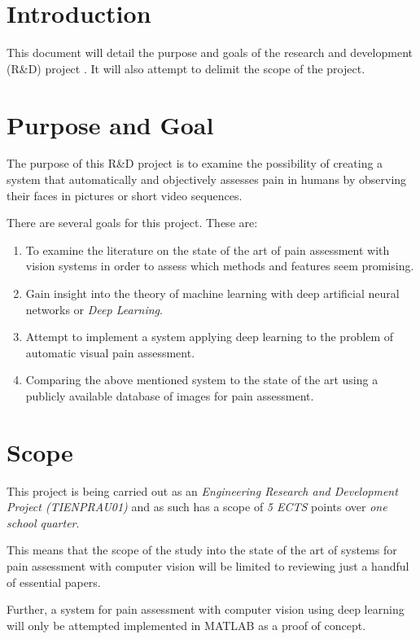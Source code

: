 \documentclass[Main]{subfiles}
\begin{document}
\section{Introduction} %
	\label{sec:introduction}
	This document will detail the purpose and goals of the research and development (R\&D) project \emph{\projectTitle}.
	It will also attempt to delimit the scope of the project.


\section{Purpose and Goal} %
	\label{sec:purpose_and_goal}
	The purpose of this R\&D project is to examine the possibility of creating a system that automatically and objectively  assesses pain in humans by observing their faces in pictures or short video sequences.

	There are several goals for this project.
	These are:
	\begin{enumerate}
		\item 
			To examine the literature on the state of the art of pain assessment with vision systems in order to assess which methods and features seem promising.
		\item
			Gain insight into the theory of machine learning with deep artificial neural networks or \emph{Deep Learning}.
		\item
			Attempt to implement a system applying deep learning to the problem of automatic visual pain assessment.
		\item 
			Comparing the above mentioned system to the state of the art using a publicly available database of images for pain assessment.
	\end{enumerate}


\section{Scope} %
	\label{sec:scope}
	This project is being carried out as an \emph{Engineering Research and Development Project (TIENPRAU01)} and as such has a scope of \emph{5 ECTS} points over \emph{one school quarter}.

	This means that the scope of the study into the state of the art of systems for pain assessment with computer vision will be limited to reviewing just a handful of essential papers.

	Further, a system for pain assessment with computer vision using deep learning will only be attempted implemented in MATLAB as a proof of concept.

\end{document}
